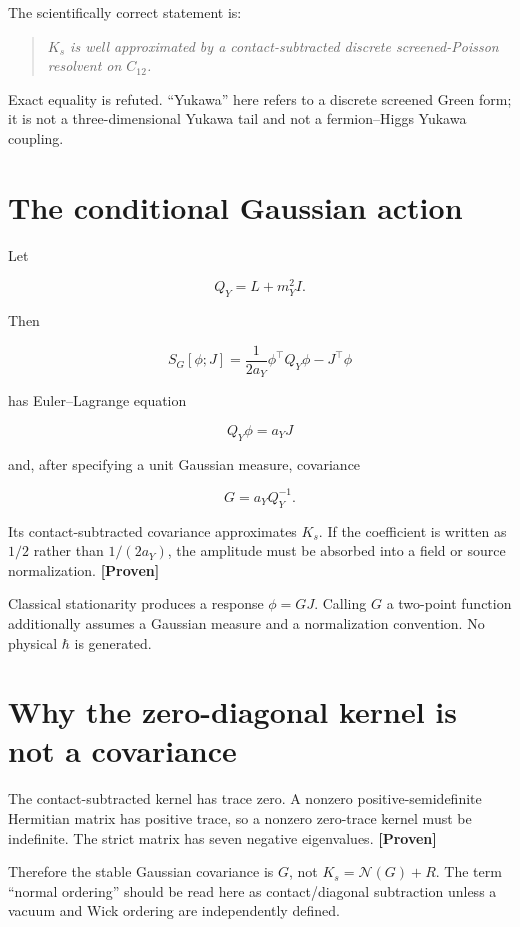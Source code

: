 \documentclass[11pt,a4paper,openany]{report}
\newcommand{\statusProven}{\textcolor{fingreen}{[Proven]}}
\begin{document}
The scientifically correct statement is:

\begin{quote}\itshape
\(K_s\) is well approximated by a contact-subtracted discrete screened-Poisson resolvent on \(C_{12}\).

\end{quote}

Exact equality is refuted. “Yukawa” here refers to a discrete screened Green form; it is not a three-dimensional Yukawa tail and not a fermion–Higgs Yukawa coupling.

\section{The conditional Gaussian action}

Let

\[
Q_Y=L+m_Y^2I.
\]

Then

\[
S_G[\phi;J]
=\frac{1}{2a_Y}\phi^\top Q_Y\phi-J^\top\phi
\]

has Euler–Lagrange equation

\[
Q_Y\phi=a_YJ
\]

and, after specifying a unit Gaussian measure, covariance

\[
G=a_YQ_Y^{-1}.
\]

Its contact-subtracted covariance approximates \(K_s\). If the coefficient is written as \(1/2\) rather than \(1/(2a_Y)\), the amplitude must be absorbed into a field or source normalization. \textbf{\statusProven{}}

Classical stationarity produces a response \(\phi=GJ\). Calling \(G\) a two-point function additionally assumes a Gaussian measure and a normalization convention. No physical \(\hbar\) is generated.

\section{Why the zero-diagonal kernel is not a covariance}

The contact-subtracted kernel has trace zero. A nonzero positive-semidefinite Hermitian matrix has positive trace, so a nonzero zero-trace kernel must be indefinite. The strict matrix has seven negative eigenvalues. \textbf{\statusProven{}}

Therefore the stable Gaussian covariance is \(G\), not \(K_s=\mathcal N(G)+R\). The term “normal ordering” should be read here as contact/\allowbreak{}diagonal subtraction unless a vacuum and Wick ordering are independently defined.
\end{document}
